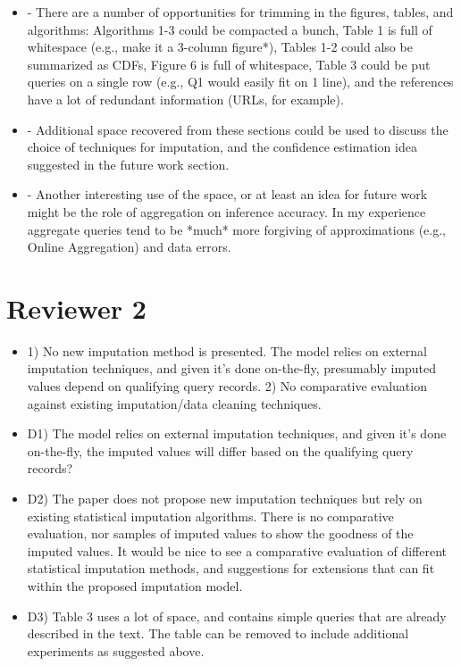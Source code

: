 \documentclass[draft,12pt]{article}
\begin{document}
\begin{itemize}
\item - There are a number of opportunities for trimming in the figures, tables, and algorithms: Algorithms 1-3 could be compacted a bunch, Table 1 is full of whitespace (e.g., make it a 3-column {figure*}), Tables 1-2 could also be summarized as CDFs, Figure 6 is full of whitespace, Table 3 could be put queries on a single row (e.g., Q1 would easily fit on 1 line), and the references have a lot of redundant information (URLs, for example). 

\item - Additional space recovered from these sections could be used to discuss the choice of techniques for imputation, and the confidence estimation idea suggested in the future work section. 

\item - Another interesting use of the space, or at least an idea for future work might be the role of aggregation on inference accuracy. In my experience aggregate queries tend to be *much* more forgiving of approximations (e.g., Online Aggregation) and data errors.
\end{itemize}

\section{Reviewer 2}
\begin{itemize}
\item 1) No new imputation method is presented. The model relies on external imputation techniques, and given it's done on-the-fly, presumably imputed values depend on qualifying query records. 
2) No comparative evaluation against existing imputation/data cleaning techniques.

\item D1) The model relies on external imputation techniques, and given it's done on-the-fly, the imputed values will differ based on the qualifying query records? 

\item D2) The paper does not propose new imputation techniques but rely on existing statistical imputation algorithms. There is no comparative evaluation, nor samples of imputed values to show the goodness of the imputed values. It would be nice to see a comparative evaluation of different statistical imputation methods, and suggestions for extensions that can fit within the proposed imputation model. 

\item D3) Table 3 uses a lot of space, and contains simple queries that are already described in the text. The table can be removed to include additional experiments as suggested above. 
\end{itemize}
\end{document}
